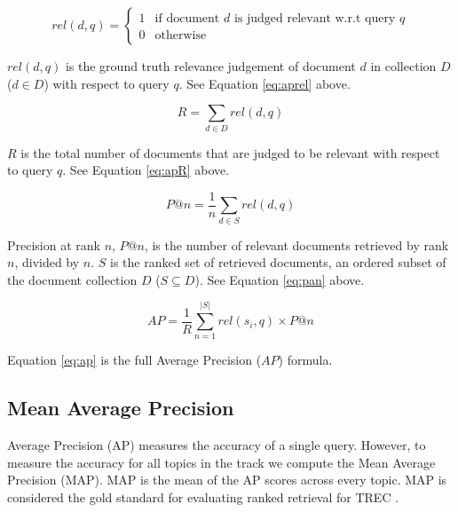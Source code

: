 \begin{equation}
    rel(d, q) = \begin{cases} 1 & \text{if document } d \text{ is judged relevant w.r.t query } q \\ 0 & \text{otherwise} \end{cases}
    \label{eq:aprel}
\end{equation}

\noindent
$rel(d, q)$ is the ground truth relevance judgement of document $d$ in collection $D$ ($d \in D$) with respect to query $q$. See Equation \ref{eq:aprel} above.

\begin{equation}
    R = \sum_{d \in D}rel(d, q)
    \label{eq:apR}
\end{equation}

\noindent
$R$ is the total number of documents that are judged to be relevant with respect to query $q$. See Equation \ref{eq:apR} above.

\begin{equation}
    P@n = \frac{1}{n} \sum_{d \in S}rel(d, q)
    \label{eq:pan}
\end{equation}

\noindent
Precision at rank $n$, $P@n$, is the number of relevant documents retrieved by rank $n$, divided by $n$. $S$ is the ranked set of retrieved documents, an ordered subset of the document collection $D$ ($S \subseteq D$). See Equation \ref{eq:pan} above.

\begin{equation}
    AP = \frac{1}{R}\sum_{n=1}^{|S|} rel(s_{i}, q) \times P@n
    \label{eq:ap}
\end{equation}

\noindent
Equation \ref{eq:ap} is the full Average Precision ($AP$) formula.



\subsection{Mean Average Precision}
Average Precision (AP) measures the accuracy of a single query. However, to measure the accuracy for all topics in the track we compute the Mean Average Precision (MAP). MAP is the mean of the AP scores across every topic. MAP is considered the gold standard for evaluating ranked retrieval for TREC \cite{TRECAP}.




